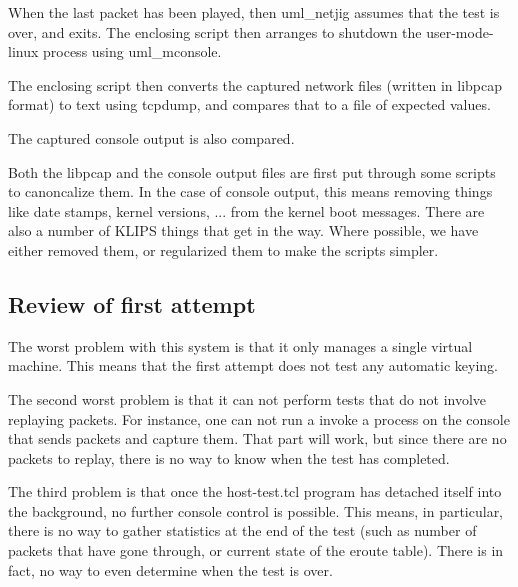 When the last packet has been played, then uml\_netjig assumes that
the test is over, and exits. The enclosing script then arranges to shutdown
the user-mode-linux process using uml\_mconsole.

The enclosing script then converts the captured network files (written
in libpcap format) to text using tcpdump, and compares that to a file
of expected values.

The captured console output is also compared. 

Both the libpcap and the console output files are first put through some
scripts to canoncalize them. In the case of console output, this means
removing things like date stamps, kernel versions, ... from the kernel
boot messages. There are also a number of KLIPS things that get in the
way. Where possible, we have either removed them, or regularized them to
make the scripts simpler.

\subsection{Review of first attempt}

The worst problem with this system is that it only manages a single
virtual machine. This means that the first attempt does not test
any automatic keying.

The second worst problem is that it can not perform tests that do not
involve replaying packets. For instance, one can not run a invoke
a process on the console that sends packets and capture them. That part
will work, but since there are no packets to replay, there is no way to
know when the test has completed.

The third problem is that once the host-test.tcl program has detached
itself into the background, no further console control is possible.
This means, in particular, there is no way to gather statistics at the
end of the test (such as number of packets that have gone through, or
current state of the eroute table). There is in fact, no way to even
determine when the test is over.




